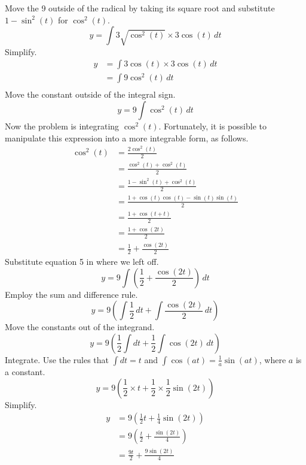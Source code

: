 \documentclass{article}
\begin{document}
Move the 9 outside of the radical by taking its square root and substitute $1-\sin^2(t)$ for $\cos^2(t)$.
\begin{equation*}
    y=\int 3\sqrt{\cos^2(t)} \times 3\cos(t)\, dt
\end{equation*}
Simplify.
\begin{align*}
    y &= \int 3\cos(t) \times 3\cos(t)\, dt\\
    &= \int 9\cos^2(t)\, dt\\
\end{align*}
Move the constant outside of the integral sign.
\begin{equation*}
    y=9\int \cos^2(t)\, dt
\end{equation*}
Now the problem is integrating $\cos^2(t)$. Fortunately, it is possible to manipulate this expression into a more integrable form, as follows.
\begin{align*}
    \cos^2(t) &= \frac{2\cos^2(t)}{2}\\
    &= \frac{\cos^2(t)+\cos^2(t)}{2}\\
    &= \frac{1-\sin^2(t)+\cos^2(t)}{2}\\
    &= \frac{1+\cos(t)\cos(t)-\sin(t)\sin(t)}{2}\\
    &= \frac{1+\cos(t+t)}{2}\\
    &= \frac{1+\cos(2t)}{2}\\
    &= \frac{1}{2}+\frac{\cos(2t)}{2}\tag{5}
\end{align*}
Substitute equation 5 in where we left off.
\begin{equation*}
    y=9\int \left(\frac{1}{2}+\frac{\cos(2t)}{2}\right)\, dt
\end{equation*}
Employ the sum and difference rule.
\begin{equation*}
    y=9\left(\int \frac{1}{2}\, dt+\int \frac{\cos(2t)}{2}\, dt\right)
\end{equation*}
Move the constants out of the integrand.
\begin{equation*}
    y=9\left(\frac{1}{2}\int dt+\frac{1}{2}\int \cos(2t)\, dt\right)
\end{equation*}
Integrate. Use the rules that $\int dt=t$ and $\int \cos(at)=\frac{1}{a}\sin(at)$, where $a$ is a constant.
\begin{equation*}
    y=9\left(\frac{1}{2} \times t+\frac{1}{2} \times \frac{1}{2}\sin(2t)\right)
\end{equation*}
Simplify.
\begin{align*}
    y &= 9\left(\frac{1}{2}t+\frac{1}{4}\sin(2t)\right)\\
    &= 9\left(\frac{t}{2}+\frac{\sin(2t)}{4}\right)\\
    &= \frac{9t}{2}+\frac{9\sin(2t)}{4}
\end{align*}
\end{document}
